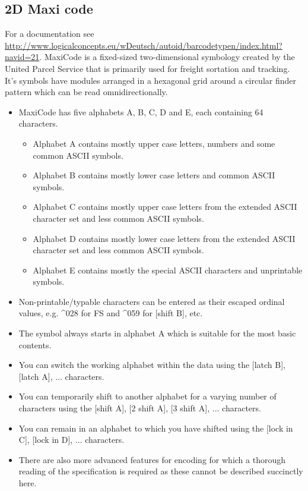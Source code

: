 \documentclass{article}
\begin{document}
\subsection{2D Maxi code}
For a documentation see \url{http://www.logicalconcepts.eu/wDeutsch/autoid/barcodetypen/index.html?navid=21}.
MaxiCode is a fixed-sized two-dimensional symbology created by the 
United Parcel Service that is primarily used for freight sortation 
and tracking. It's symbols have modules arranged in a hexagonal 
grid around a circular finder pattern which can be read omnidirectionally.

\begin{itemize}
\item      MaxiCode has five alphabets A, B, C, D and E, each containing 64 characters.
\begin{itemize}
	\item Alphabet A contains mostly upper case letters, numbers and some common ASCII symbols.
    \item Alphabet B contains mostly lower case letters and common ASCII symbols.
    \item  Alphabet C contains mostly upper case letters from the extended ASCII character set and less common ASCII symbols.
    \item Alphabet D contains mostly lower case letters from the extended ASCII character set and less common ASCII symbols.
    \item Alphabet E contains mostly the special ASCII characters and unprintable symbols.
\end{itemize}
\item Non-printable/typable characters can be entered as their escaped ordinal values, e.g. \textasciicircum 028 for FS and \textasciicircum 059 for [shift B], etc.
\item  The symbol always starts in alphabet A which is suitable for the most basic contents.
\item You can switch the working alphabet within the data using the [latch B], [latch A], ... characters.
\item  You can temporarily shift to another alphabet for a varying number of characters using the [shift A], [2 shift A], [3 shift A], ... characters.
\item  You can remain in an alphabet to which you have shifted using the [lock in C], [lock in D], ... characters.
\item There are also more advanced features for encoding for which a thorough reading of the specification is required as these cannot be described succinctly here.
\end{itemize}
\end{document}
